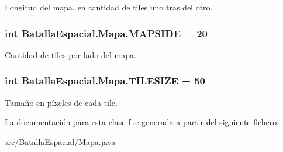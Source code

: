 \label{classBatallaEspacial_1_1Mapa_ab3fe55574e94cce2eec78c8ae16f7e6f}
Longitud del mapa, en cantidad de tiles uno tras del otro. \hypertarget{classBatallaEspacial_1_1Mapa_ae101340f9429d6fc9aae937c6764e355}{
\subsubsection[{MAPSIDE}]{\setlength{\rightskip}{0pt plus 5cm}int {\bf BatallaEspacial.Mapa.MAPSIDE} = 20}}
\label{classBatallaEspacial_1_1Mapa_ae101340f9429d6fc9aae937c6764e355}
Cantidad de tiles por lado del mapa. \hypertarget{classBatallaEspacial_1_1Mapa_abd8ee7e7f142cb6eee0c4117e5a2e38a}{
\subsubsection[{TILESIZE}]{\setlength{\rightskip}{0pt plus 5cm}int {\bf BatallaEspacial.Mapa.TILESIZE} = 50}}
\label{classBatallaEspacial_1_1Mapa_abd8ee7e7f142cb6eee0c4117e5a2e38a}
Tamaño en píxeles de cada tile. 

La documentación para esta clase fue generada a partir del siguiente fichero:\begin{DoxyCompactItemize}
\item 
src/BatallaEspacial/Mapa.java\end{DoxyCompactItemize}
